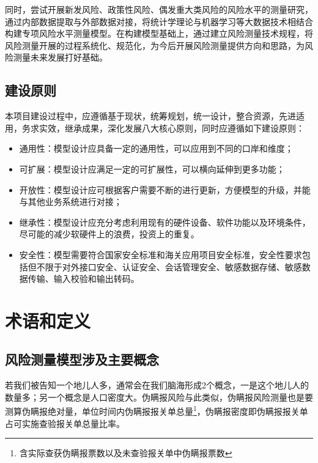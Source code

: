 \documentclass[a4paper]{tufte-book}%
\theoremstyle{definition}
\theoremstyle{definition}
\begin{document}
同时，尝试开展新发风险、政策性风险、偶发重大类风险的风险水平的测量研究，通过内部数据提取与外部数据对接，将统计学理论与机器学习等大数据技术相结合构建专项风险水平测量模型。在构建模型基础上，通过建立风险测量技术规程，将风险测量开展的过程系统化、规范化，为今后开展风险测量提供方向和思路，为风险测量未来发展打好基础。

\section{建设原则}
本项目建设过程中，应遵循基于现状，统筹规划，统一设计，整合资源，先进适用，务求实效，继承成果，深化发展八大核心原则，同时应遵循如下建设原则：

\begin{itemize}
	\item {通用性：}模型设计应具备一定的通用性，可以应用到不同的口岸和维度；
	\item {可扩展：}模型设计应满足一定的可扩展性，可以横向延伸到更多功能；
	
	\item {开放性：}模型设计应可根据客户需要不断的进行更新，方便模型的升级，并能与其他业务系统进行对接；
	\item{继承性：}模型设计应充分考虑利用现有的硬件设备、软件功能以及环境条件，尽可能的减少软硬件上的浪费，投资上的重复。 
	\item {安全性：}模型需要符合国家安全标准和海关应用项目安全标准，安全性要求包括但不限于对外接口安全、认证安全、会话管理安全、敏感数据存储、敏感数据传输、输入校验和输出转码。
\end{itemize}







\chapter{术语和定义}

\section{风险测量模型涉及主要概念}
若我们被告知一个地儿人多，通常会在我们脑海形成2个概念，一是这个地儿人的数量多；另一个概念是人口密度大。伪瞒报风险与此类似，伪瞒报风险测量也是要测算伪瞒报绝对量，单位时间内伪瞒报报关单总量\footnote{含实际查获伪瞒报票数以及未查验报关单中伪瞒报票数}，伪瞒报密度即伪瞒报报关单占可实施查验报关单总量比率。
\end{document}
